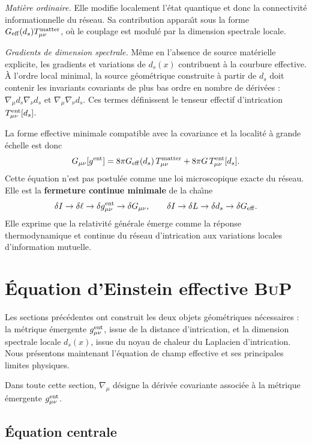 \documentclass[11pt]{article}
\newcommand{\Geff}{G_{\rm eff}}
\newcommand{\BuP}{\textsc{BuP}}
\newcommand{\ent}{\rm ent}
\begin{document}
\textit{Mati\`ere ordinaire.} Elle modifie localement l'\'etat quantique et donc
la connectivit\'e informationnelle du r\'eseau. Sa contribution appara\^{\i}t sous la forme
$\Geff(d_s)T_{\mu\nu}^{\rm matter}$, o\`u le couplage est modul\'e par la dimension
spectrale locale.

\textit{Gradients de dimension spectrale.} M\^eme en l'absence de source mat\'erielle
explicite, les gradients et variations de $d_s(x)$ contribuent \`a la courbure effective.
\`A l'ordre local minimal, la source g\'eom\'etrique construite \`a partir de $d_s$ doit
contenir les invariants covariants de plus bas ordre en nombre de d\'eriv\'ees :
$\nabla_\mu d_s\nabla_\nu d_s$ et $\nabla_\mu\nabla_\nu d_s$.
Ces termes d\'efinissent le tenseur effectif d'intrication $T_{\mu\nu}^{\ent}[d_s]$.

La forme effective minimale compatible avec la covariance et la localit\'e \`a grande
\'echelle est donc
\[
G_{\mu\nu}[g^{\rm ent}]
=
8\pi\Geff(d_s)\,T_{\mu\nu}^{\rm matter}
+
8\pi G\,T_{\mu\nu}^{\ent}[d_s].
\]
Cette \'equation n'est pas postul\'ee comme une loi microscopique exacte du r\'eseau.
Elle est la \textbf{fermeture continue minimale} de la cha\^{\i}ne
\[
\delta I\to\delta\ell\to\delta g_{\mu\nu}^{\rm ent}\to\delta G_{\mu\nu},
\qquad
\delta I\to\delta L\to\delta d_s\to\delta\Geff.
\]
Elle exprime que la relativit\'e g\'en\'erale \'emerge comme la r\'eponse
thermodynamique et continue du r\'eseau d'intrication aux variations locales
d'information mutuelle.

\section{\'Equation d'Einstein effective \BuP}
\label{sec:einstein}

Les sections pr\'ec\'edentes ont construit les deux objets g\'eom\'etriques
n\'ecessaires : la m\'etrique \'emergente $g_{\mu\nu}^{\rm ent}$, issue de la distance
d'intrication, et la dimension spectrale locale $d_s(x)$, issue du noyau de chaleur
du Laplacien d'intrication. Nous pr\'esentons maintenant l'\'equation de champ
effective et ses principales limites physiques.

Dans toute cette section, $\nabla_\mu$ d\'esigne la d\'eriv\'ee covariante associ\'ee
\`a la m\'etrique \'emergente $g_{\mu\nu}^{\rm ent}$.

\subsection{\'Equation centrale}
\end{document}
